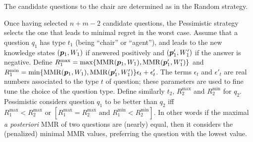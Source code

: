 \documentclass{article}
\begin{document}
The candidate questions to the chair are determined as in the Random strategy.

	Once having selected $n + m - 2$ candidate questions, the Pessimistic strategy selects the one that leads to minimal regret in the worst case.
	Assume that a question $q_1$ has type $t_1$ (being “chair” or “agent”), and leads to the new knowledge states $({\bm{p}}_1, W_1)$ if answered positively and $({\bm{p}}'_1, W'_1)$ if the answer is negative. 
	Define $R^{\max}_1 = \max\{\operatorname{MMR}({\bm{p}}_1, W_1), \operatorname{MMR}({\bm{p}}'_1, W'_1)\}$
	and $R^{\min}_1 = \min\{\operatorname{MMR}({\bm{p}}_1, W_1), \operatorname{MMR}({\bm{p}}'_1, W'_1)\} \epsilon_{t} + \epsilon'_{t}$.
	The terms $\epsilon_t$ and $\epsilon'_{t}$ are real numbers associated to the type $t$ of question; these parameters are used to fine tune the choice of the question type. 
	Define similarly $t_2$, $R^{\max}_2$ and $R^{\min}_2$ for  $q_2$.
	Pessimistic considers question $q_1$ to be better  than $q_2$ iff $R^{\max}_1 < R^{\max}_2 \text{ or } [R^{\max}_1 = R^{\max}_2 \text{ and } R^{\min}_1 < R^{\min}_2]$.
	In other words if the maximal {\em a posteriori} MMR of two questions are (nearly) equal, then it considers the (penalized) minimal MMR values, preferring the question with the lowest value.
\end{document}
